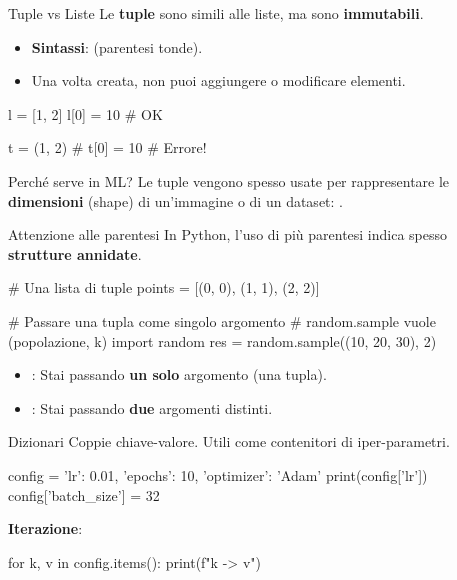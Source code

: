 \documentclass[12pt,aspectratio=169,notheorems]{beamer}
\begin{document}
\begin{frame}[fragile]{Tuple vs Liste}
    Le \textbf{tuple} sono simili alle liste, ma sono \textbf{immutabili}.
    \begin{itemize}
        \item \textbf{Sintassi}:  (parentesi tonde).
        \item Una volta creata, non puoi aggiungere o modificare elementi.
    \end{itemize}
    \begin{python}
        l = [1, 2]
        l[0] = 10    # OK

        t = (1, 2)
        # t[0] = 10  # Errore!
    \end{python}
    \begin{mlblock}{Perché serve in ML?}
        Le tuple vengono spesso usate per rappresentare le \textbf{dimensioni} (shape) di un'immagine o di un dataset: .
    \end{mlblock}
\end{frame}

\begin{frame}[fragile]{Attenzione alle parentesi}
    In Python, l'uso di più parentesi indica spesso \textbf{strutture annidate}.
    \begin{python}
        # Una lista di tuple
        points = [(0, 0), (1, 1), (2, 2)]

        # Passare una tupla come singolo argomento
        # random.sample vuole (popolazione, k)
        import random
        res = random.sample((10, 20, 30), 2)
    \end{python}
    \vfill
    \begin{itemize}
        \item {}: Stai passando \textbf{un solo} argomento (una tupla).
        \item {}: Stai passando \textbf{due} argomenti distinti.
    \end{itemize}
\end{frame}

\begin{frame}[fragile]{Dizionari}
    Coppie chiave-valore. Utili come contenitori di iper-parametri.
    \begin{python}
        config = {
            'lr': 0.01,
            'epochs': 10,
            'optimizer': 'Adam'
        }
        print(config['lr'])
        config['batch_size'] = 32
    \end{python}
    \textbf{Iterazione}:
    \begin{python}
        for k, v in config.items():
            print(f"{k} -> {v}")
    \end{python}
\end{frame}
\end{document}
